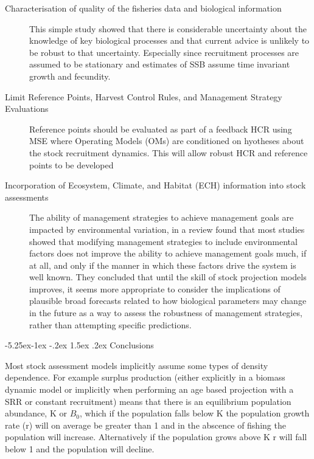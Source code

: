 \documentclass[a4paper, 10pt]{article}
\makeatletter
\renewcommand{\section}{\@startsection{section}{1}{\z@}%
  {-5.25ex\@plus -1ex \@minus -.2ex}%
  {1.5ex \@plus .2ex}%
  {\normalfont\bfseries}}
\makeatother
\begin{document}
\begin{description}
\item[Characterisation of quality of the fisheries data and biological information]

This simple study showed that there is considerable uncertainty about the knowledge of
key biological processes and that current advice is unlikely to be robust to that uncertainty.
Especially since recruitment processes are assumed to be stationary and estimates of
SSB assume time invariant growth and fecundity.

\item[Limit Reference Points, Harvest Control Rules,  and Management Strategy Evaluations]

Reference points should be evaluated as part of a feedback HCR using MSE where Operating Models (OMs)
are conditioned on hyotheses about the stock recruitment dynamics. This will allow robust HCR and
reference points to be developed

\item[Incorporation of Ecosystem, Climate, and Habitat (ECH) information into stock assessments]

The ability of management strategies to achieve management goals are impacted by environmental variation, \cite{punt2013fisheries}
in a review found that most studies showed that 
modifying management strategies to include environmental factors does not improve the ability to achieve management goals
much, if at all, and only if the manner in which these factors drive the system is well known. They concluded that until the skill of 
stock projection models improves, it seems more appropriate to consider the implications of plausible broad forecasts related to how
biological parameters may change in the future as a way to assess the robustness of management strategies, rather than attempting
specific predictions.

\end{description}

\section{Conclusions}

Most stock assessment models implicitly assume some types of density dependence. For example surplus production (either 
explicitly in a biomass dynamic model \cite{pella_generalized_1969} or implicitly when performing an age based projection with 
a SRR or constant recruitment) means that there is an equilibrium population abundance, K or $B_0$, which if the
population falls below K the population growth rate (r) will on average be greater than 1 and in the abscence of fishing the 
population will increase. Alternatively if the population grows above K r will fall below 1 and the population will decline. 
\end{document}
